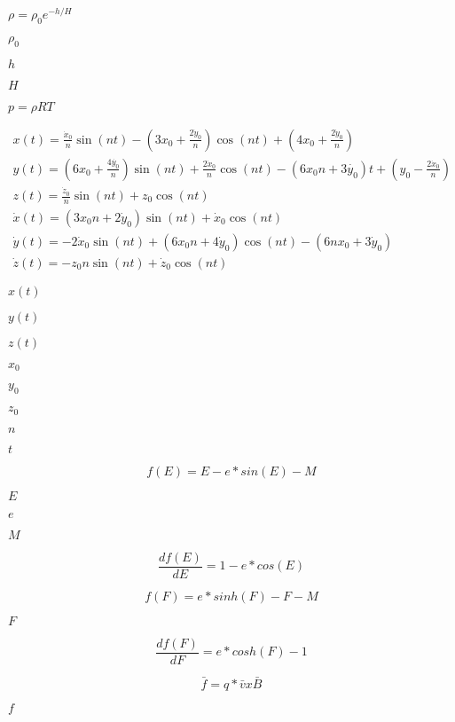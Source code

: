 \documentclass{article}
\begin{document}
$ \rho = \rho_0 e^{-h/H} $
\pagebreak

$ \rho_0 $
\pagebreak

$ h $
\pagebreak

$ H $
\pagebreak

$ p = \rho RT $
\pagebreak

\begin{eqnarray*} x( t ) = \frac{ \dot{ x }_0 }{ n } \sin( n t ) - \left( 3 x_0 + \frac{ 2 \dot{ y }_0 } { n } \right) \cos( n t ) + \left( 4 x_0 + \frac{ 2 \dot{ y }_0 }{ n } \right) \\ y( t ) = \left( 6 x_0 + \frac{ 4 \dot{ y_0 } }{ n } \right) \sin( n t ) + \frac{ 2 \dot{ x }_0 }{ n } \cos( n t ) - ( 6 x_0 n + 3 \dot{ y_0 } ) t + \left( y_0 - \frac{ 2 \dot{ x }_0 }{ n } \right) \\ z( t ) = \frac{ \dot{ z }_0 }{ n } \sin( n t ) + z_0 \cos ( n t ) \\ \dot{ x }( t ) = ( 3 x_0 n + 2 \dot{ y }_0 ) \sin( n t ) + \dot{ x }_0 \cos( n t ) \\ \dot{ y }( t ) = - 2 \dot{ x }_0 \sin( n t ) + ( 6 x_0 n + 4 \dot{ y }_0 ) \cos( n t) - ( 6 n x_0 + 3 \dot{ y }_0 ) \\ \dot{ z }( t ) = - z_0 n \sin( n t ) + \dot{ z }_0 \cos( n t ) \end{eqnarray*}
\pagebreak

$ x( t ) $
\pagebreak

$ y( t ) $
\pagebreak

$ z( t ) $
\pagebreak

$ x_0 $
\pagebreak

$ y_0 $
\pagebreak

$ z_0 $
\pagebreak

$ n $
\pagebreak

$ t $
\pagebreak

\[ f( E ) = E - e * sin( E ) - M \]
\pagebreak

$ E $
\pagebreak

$ e $
\pagebreak

$ M $
\pagebreak

\[ \frac{ df( E ) } { dE } = 1 - e * cos( E ) \]
\pagebreak

\[ f( F ) = e * sinh( F ) - F - M \]
\pagebreak

$ F $
\pagebreak

\[ \frac{ df( F ) } { dF } = e * cosh( F ) - 1 \]
\pagebreak

\[ \bar{f} = q * \bar{v} x \bar{B} \]
\pagebreak

$f$
\pagebreak
\end{document}
